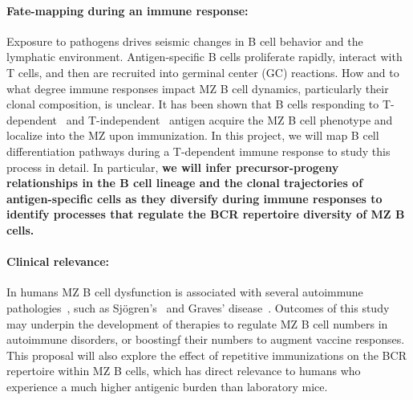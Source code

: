 \documentclass[11pt]{article}
\newcommand{\para}[1]{\vspace*{-4.5mm}\paragraph{#1}}
\newcommand{\red}[1]{{\color{red}{#1}}}
\begin{document}
\para{Fate-mapping during an immune response:} 
Exposure to pathogens drives seismic changes in B cell behavior and the lymphatic environment. Antigen-specific B cells proliferate rapidly, interact with T cells, and then are recruited into germinal center (GC) reactions. 
How and to what degree immune responses impact MZ B cell dynamics, particularly their clonal composition, is unclear.
It has been shown that B cells responding to T-dependent~\cite{Liu_1988, Yang_Shih_2002} and T-independent~\cite{Vinuesa_2003} antigen acquire the MZ B cell phenotype and localize into the MZ upon immunization.
In this project, we will map B cell differentiation pathways during a T-dependent immune response to study this process in detail. %
In particular, \textbf{we will infer precursor-progeny relationships in the B cell lineage and the clonal trajectories of antigen-specific cells as they diversify during immune responses to identify processes that regulate the BCR repertoire diversity of MZ B cells.}
 

\para{Clinical relevance:}
In humans MZ B cell dysfunction is associated with several autoimmune pathologies~\cite{Palm_2021, Appelgren_2018}, such as Sjögren's~\cite{Daridon_2006, Guerrier_2012} and  Graves' disease~\cite{Segundo_2001}.   
Outcomes of this study may underpin the development of therapies to regulate MZ B cell numbers in autoimmune disorders, or boostingf their numbers to augment vaccine responses.%
This proposal will also explore the effect of repetitive immunizations on the BCR repertoire within MZ B cells, which has direct relevance to humans who experience a much higher antigenic burden than laboratory mice.
\end{document}
